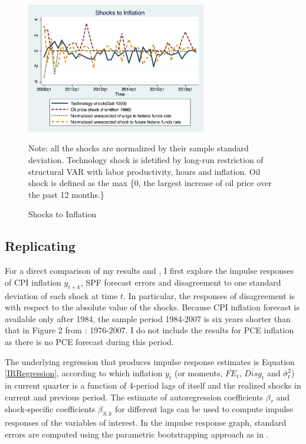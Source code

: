 \documentclass[12pt]{article}
\begin{document}
	\begin{figure}[ht]
		\centering
		\includegraphics[width=0.7\textwidth]{figures/inf_shocksQ.png}
			\begin{flushleft}
			{\footnotesize Note: all the shocks are normalized by their sample standard deviation. Technology shock is idetified by long-run restriction of structural VAR with labor productivity, hours and inflation. Oil shock is defined as the max \{0, the largest increase of oil price over the past 12 months.\} }
		\end{flushleft}
		\caption{ Shocks to Inflation}
		\label{Inflationshocks}
	\end{figure}
	
	\subsection{Replicating \citet{coibion2012can}}
	
	For a direct comparison of my results and \citet{coibion2012can}, I first explore the impulse responses of CPI inflation $y_{t+k}$, SPF forecast errors and disagreement to one standard deviation of each shock at time $t$. In particular, the responses of disagreement is with respect to the absolute value of the shocks. Because CPI inflation forecast is available only after 1984, the sample period 1984-2007 is six years shorter than that in Figure 2 from \citet{coibion2012can}: 1976-2007. I do not include the results for PCE inflation as there is no PCE forecast during this period. 
	
	The underlying regression that produces impulse response estimates is  Equation \ref{IRRegression}, according to which inflation $y_t$ (or moments, $\overline {FE}_{t}$, $\overline{Disg}_t$ and $\bar \sigma^2_t$) in current quarter is a function of 4-period lags of itself and the realized shocks in current and previous period. The estimate of autoregression coefficients $\beta_\tau$ and shock-specific coefficients $\beta_{S,k}$ for different lags can be used to compute impulse responses of the variables of interest. In the impulse response graph, standard errors are computed using the parametric bootstrapping approach as in \citet{coibion2012can}. 
	
\end{document}
